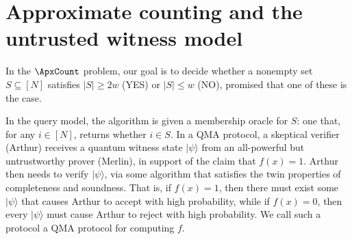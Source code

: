 \section*{Approximate counting and the untrusted witness model}
\begin{problem}
In the $\ApxCount$ problem, our goal is to decide whether a nonempty set $S\subseteq[N]$ satisfies $|S|\ge2w$ (YES) or $|S|\le w$ (NO), promised that one of these is the case.
\end{problem}
In the query model, the algorithm is given a membership oracle for $S$: one that, for any $i\in[N]$, returns whether $i\in S$.
In a QMA protocol, a skeptical verifier (Arthur) receives a quantum witness state $|\psi\rangle$ from an all-powerful but untrustworthy prover (Merlin), in support of the claim that $f(x)=1$. Arthur then needs to verify $|\psi\rangle$, via some algorithm that satisfies the twin properties of completeness and soundness. That is, if $f(x)=1$, then there must exist some $|\psi\rangle$ that causes Arthur to accept with high probability, while if $f(x)=0$, then every $|\psi\rangle$ must cause Arthur to reject with high probability. We call such a protocol a QMA protocol for computing $f$.
